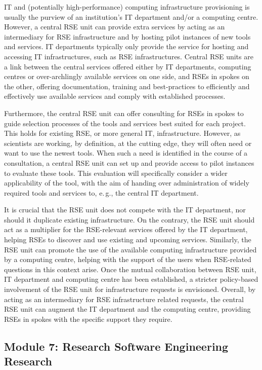 \documentclass[a4paper]{article}
\makeatletter
\newcommand*{\eg}{e.\,g.\@\xspace}
\makeatother
\begin{document}
IT and (potentially high-performance) computing infrastructure provisioning is usually the purview of an institution's IT department and/or a computing centre.
However, a central RSE unit can provide extra services by acting as an intermediary for RSE infrastructure and by hosting pilot instances of new tools and services.
IT departments typically only provide the service for hosting and accessing IT infrastructures, such as RSE infrastructures.
Central RSE units are a link between the central services offered either by IT departments, computing centres or over-archlingly available services on one side,
and RSEs in spokes on the other, offering documentation, training and best-practices to efficiently and effectively use available services and comply with established processes.

Furthermore, the central RSE unit can offer consulting for RSEs in spokes to guide selection processes of the tools and services best suited for each project.
This holds for existing RSE, or more general IT, infrastructure.
However, as scientists are working, by definition, at the cutting edge, they will often need or want to use the newest tools.
When such a need is identified in the course of a consultation, a central RSE unit can set up and provide access to pilot instances to evaluate these tools.
This evaluation will specifically consider a wider applicability of the tool, with the aim of handing over administration of widely required tools and services to, \eg{}, the central IT department.

It is crucial that the RSE unit does not compete with the IT department, nor should it duplicate existing infrastructure.
On the contrary, the RSE unit should act as a multiplier for the RSE-relevant services offered by the IT department, helping RSEs to discover and use existing and upcoming services.
Similarly, the RSE unit can promote the use of the available computing infrastructure provided by a computing centre, helping with the support of the users when RSE-related questions in this context arise.
Once the mutual collaboration between RSE unit, IT department and computing centre has been established, a stricter policy-based involvement of the RSE unit for infrastructure requests is envisioned.
Overall, by acting as an intermediary for RSE infrastructure related requests, the central RSE unit can augment the IT department and the computing centre, providing RSEs in spokes with the specific support they require.

\subsection{Module 7: Research Software Engineering Research}%
\label{sec:rseresearch}
\end{document}

